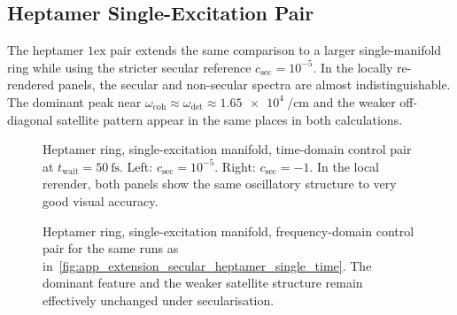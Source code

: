 \subsection{Heptamer Single-Excitation Pair}

The heptamer \(1\mathrm{ex}\) pair extends the same comparison to a larger
single-manifold ring while using the stricter secular reference
\(c_{\mathrm{sec}}=10^{-5}\). In the locally re-rendered panels, the secular
and non-secular spectra are almost indistinguishable. The dominant peak near
\(\omega_{\mathrm{coh}} \approx \omega_{\mathrm{det}} \approx
\SI{1.65e4}{\per\centi\meter}\) and the weaker off-diagonal satellite pattern
appear in the same places in both calculations.

\begin{figure}[htbp]
    \centering
    \begin{minipage}[t]{0.49\linewidth}
        \centering
        \safeplaceholdergraphic[1.18\linewidth]{\heptamerSingleSecTimePath}
    \end{minipage}\hfill
    \begin{minipage}[t]{0.49\linewidth}
        \centering
        \safeplaceholdergraphic[1.18\linewidth]{\heptamerSingleNonSecTimePath}
    \end{minipage}
    \caption{Heptamer ring, single-excitation manifold, time-domain control
    pair at \(t_{\mathrm{wait}}=\SI{50}{\femto\second}\). Left:
    \(c_{\mathrm{sec}}=10^{-5}\). Right: \(c_{\mathrm{sec}}=-1\). In the local
    rerender, both panels show the same oscillatory structure to very good
    visual accuracy.}
    \label{fig:app_extension_secular_heptamer_single_time}
\end{figure}

\begin{figure}[htbp]
    \centering
    \begin{minipage}[t]{0.49\linewidth}
        \centering
        \safeplaceholdergraphic[1.18\linewidth]{\heptamerSingleSecFreqPath}
    \end{minipage}\hfill
    \begin{minipage}[t]{0.49\linewidth}
        \centering
        \safeplaceholdergraphic[1.18\linewidth]{\heptamerSingleNonSecFreqPath}
    \end{minipage}
    \caption{Heptamer ring, single-excitation manifold, frequency-domain
    control pair for the same runs as
    in~\autoref{fig:app_extension_secular_heptamer_single_time}. The dominant
    feature and the weaker satellite structure remain effectively unchanged
    under secularisation.}
    \label{fig:app_extension_secular_heptamer_single_freq}
\end{figure}

